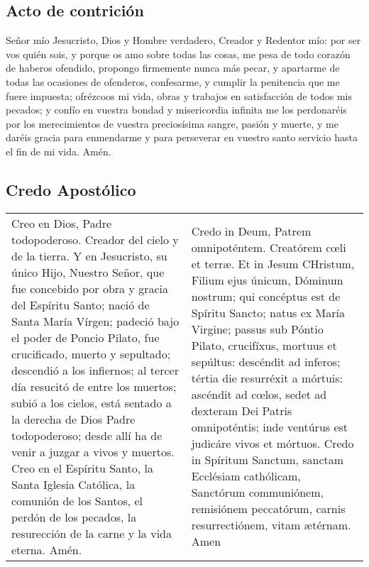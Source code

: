 \documentclass[./devocionario.tex]{subfiles}
\begin{document}
\subsection*{Acto de contrición}
Señor mío Jesucristo, Dios y Hombre verdadero, Creador y Redentor mío: por ser vos quién sois, y porque os amo sobre todas las cosas, 
me pesa de todo corazón de haberos ofendido, propongo firmemente nunca más pecar, y apartarme de todas las ocasiones de ofenderos, 
confesarme, y cumplir la penitencia que me fuere impuesta; ofrézcoos mi vida, obras y trabajos en satisfacción de todos mis pecados; 
y confío en vuestra bondad y misericordia infinita me los perdonaréis por los merecimientos de vuestra preciosísima sangre, pasión y muerte, 
y me daréis gracia para enmendarme y para perseverar en vuestro santo servicio hasta el fin de mi vida. Amén.

\subsection*{Credo Apostólico}
\begin{tabular} { p{} p{} }
    Creo en Dios, Padre todopoderoso. Creador del cielo y de la tierra. Y en Jesucristo, su único Hijo, Nuestro Señor, 
    que fue concebido por obra y gracia del Espíritu Santo; nació de Santa María Vírgen; padeció bajo el poder de Poncio Pilato, 
    fue crucificado, muerto y sepultado; descendió a los infiernos; al tercer día resucitó de entre los muertos; subió a los cielos, 
    está sentado a la derecha de Dios Padre todopoderoso; desde allí ha de venir a juzgar a vivos y muertos. 
    Creo en el Espíritu Santo, la Santa Iglesia Católica, la comunión de los Santos, el perdón de los pecados, 
    la resurección de la carne y la vida eterna. Amén.

    &

    Credo in Deum, Patrem omnipoténtem. Creatórem cœli et terræ. Et in Jesum CHristum, Filium ejus únicum, Dóminum nostrum; 
    qui concéptus est de Spíritu Sancto; natus ex María Virgine; passus sub Póntio Pilato, crucifíxus, mortuus et sepúltus: 
    descéndit ad inferos; tértia die resurréxit a mórtuis: ascéndit ad cœlos, sedet ad dexteram Dei Patris omnipoténtis; 
    inde ventúrus est judicáre vivos et mórtuos. Credo in Spíritum Sanctum, sanctam Ecclésiam cathólicam, Sanctórum communiónem, 
    remisiónem peccatórum, carnis resurrectiónem, vitam ætérnam. Amen
\end{tabular}
\end{document}
